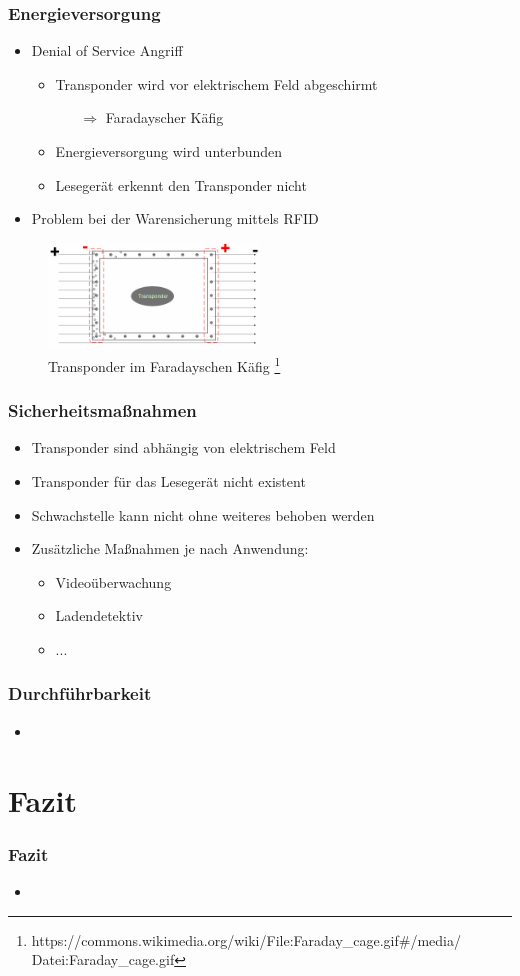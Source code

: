 \documentclass{beamer}
\begin{document}
\begin{frame}
\frametitle{Energieversorgung}

\begin{itemize}
	\item Denial of Service Angriff
	\begin{itemize}
		\item Transponder wird vor elektrischem Feld abgeschirmt
		\begin{itemize}
			\item[$\Rightarrow$] Faradayscher Käfig
		\end{itemize}
		\item Energieversorgung wird unterbunden 
		\item Lesegerät erkennt den Transponder nicht
	\end{itemize}
	
	\item Problem bei der Warensicherung mittels RFID
\end{itemize}

\begin{figure}
\includegraphics[width=0.5\textwidth]{img/kaefig.png}
\caption{Transponder im Faradayschen Käfig \footnote{https://commons.wikimedia.org/wiki/File:Faraday\_cage.gif\#/media/ Datei:Faraday\_cage.gif}}
\end{figure}
\end{frame}


\begin{frame}
\frametitle{Sicherheitsmaßnahmen}

\begin{itemize}
	\item Transponder sind abhängig von elektrischem Feld
	\item Transponder für das Lesegerät nicht existent
	\item Schwachstelle kann nicht ohne weiteres behoben werden
	\item Zusätzliche Maßnahmen je nach Anwendung:
	\begin{itemize}
		\item Videoüberwachung
		\item Ladendetektiv
		\item ...
	\end{itemize}
\end{itemize}
\end{frame}


\begin{frame}
\frametitle{Durchführbarkeit}

\begin{itemize}
\item
\end{itemize}
\end{frame}

\section{Fazit}
\begin{frame}
\frametitle{Fazit}

\begin{itemize}
\item
\end{itemize}
\end{frame}
\end{document}
